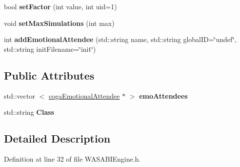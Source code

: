 \begin{DoxyCompactItemize}
\item 
\hypertarget{class_w_a_s_a_b_i_engine_a0a4999f62ff8e228469b778585c55831}{
bool {\bfseries set\-Factor} (int value, int uid=1)}
\label{class_w_a_s_a_b_i_engine_a0a4999f62ff8e228469b778585c55831}

\item 
\hypertarget{class_w_a_s_a_b_i_engine_a528d8baced03e67e11439c8a04f9e6a3}{
void {\bfseries set\-Max\-Simulations} (int max)}
\label{class_w_a_s_a_b_i_engine_a528d8baced03e67e11439c8a04f9e6a3}

\item 
\hypertarget{class_w_a_s_a_b_i_engine_a8dbfcd81addce75eb03fe784f8596b2e}{
int {\bfseries add\-Emotional\-Attendee} (std\-::string name, std\-::string global\-I\-D=\char`\"{}undef\char`\"{}, std\-::string init\-Filename=\char`\"{}init\char`\"{})}
\label{class_w_a_s_a_b_i_engine_a8dbfcd81addce75eb03fe784f8596b2e}

\end{DoxyCompactItemize}
\subsection*{\-Public \-Attributes}
\begin{DoxyCompactItemize}
\item 
\hypertarget{class_w_a_s_a_b_i_engine_aec54c4d7d1debc3f77df23d746550291}{
std\-::vector\*
$<$ \hyperlink{classcoga_emotional_attendee}{coga\-Emotional\-Attendee} $\ast$ $>$ {\bfseries emo\-Attendees}}
\label{class_w_a_s_a_b_i_engine_aec54c4d7d1debc3f77df23d746550291}

\item 
\hypertarget{class_w_a_s_a_b_i_engine_aad318caa6298309bab74ca37ea69ce59}{
std\-::string {\bfseries \-Class}}
\label{class_w_a_s_a_b_i_engine_aad318caa6298309bab74ca37ea69ce59}

\end{DoxyCompactItemize}


\subsection{\-Detailed \-Description}


\-Definition at line 32 of file \-W\-A\-S\-A\-B\-I\-Engine.\-h.



